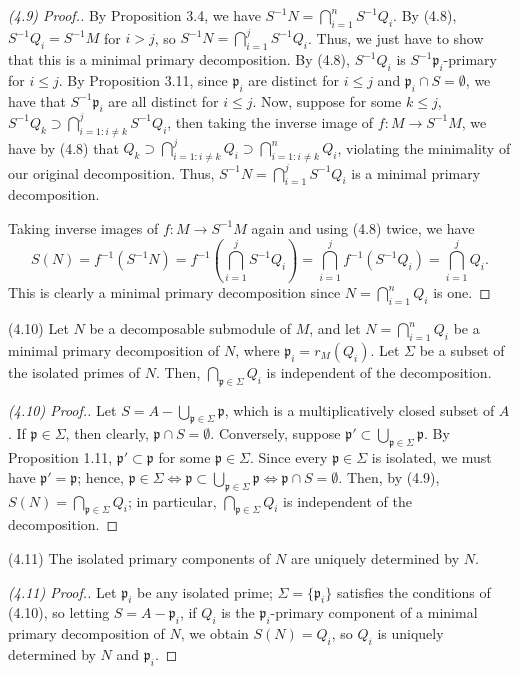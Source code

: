 \begin{proof}[(4.9) Proof.]
By Proposition 3.4, we have $S^{-1}N = \bigcap_{i=1}^n S^{-1}Q_i$. By (4.8), $S^{-1}Q_i = S^{-1}M$ for $i > j$, so $S^{-1}N = \bigcap_{i=1}^j S^{-1}Q_i$. Thus, we just have to show that this is a minimal
primary decomposition. By (4.8), $S^{-1}Q_i$ is $S^{-1}\mathfrak{p}_i$-primary for $i \le j$. By Proposition 3.11, since $\mathfrak{p}_i$ are distinct for $i \le j$ and $\mathfrak{p}_i \cap S = \emptyset$,
we have that $S^{-1}\mathfrak{p}_i$ are all distinct for $i \le j$. Now, suppose for some $k \le j$, $S^{-1}Q_k \supset \bigcap_{i=1 : i \neq k}^j S^{-1}Q_i$, then taking the inverse image of $f: M \to S^{-1}M$,
we have by (4.8) that $Q_k \supset \bigcap_{i=1 : i \neq k}^j Q_i \supset \bigcap_{i=1: i\neq k}^n Q_i$, violating the minimality of our original decomposition. Thus, $S^{-1}N = \bigcap_{i=1}^j S^{-1}Q_i$ is
a minimal primary decomposition.

Taking inverse images of $f : M \to S^{-1}M$ again and using (4.8) twice, we have
$$S(N) = f^{-1}(S^{-1}N) = f^{-1}\left(\bigcap_{i=1}^j S^{-1}Q_i\right) = \bigcap_{i=1}^j f^{-1}(S^{-1}Q_i) = \bigcap_{i=1}^j Q_i.$$
This is clearly a minimal primary decomposition since $N = \bigcap_{i=1}^n Q_i$ is one.
\end{proof}

(4.10) Let $N$ be a decomposable submodule of $M$, and let $N = \bigcap_{i=1}^n Q_i$ be a minimal primary decomposition of $N$, where $\mathfrak{p}_i = r_M(Q_i)$. Let $\Sigma$ be
a subset of the isolated primes of $N$. Then, $\bigcap_{\mathfrak{p} \in \Sigma} Q_i$ is independent of the decomposition.

\begin{proof}[(4.10) Proof.]
Let $S = A - \bigcup_{\mathfrak{p} \in \Sigma}\mathfrak{p}$, which is a multiplicatively closed subset of $A$. If $\mathfrak{p} \in \Sigma$, then clearly, $\mathfrak{p} \cap S = \emptyset$.
Conversely, suppose $\mathfrak{p}' \subset \bigcup_{\mathfrak{p} \in \Sigma}\mathfrak{p}$. By Proposition 1.11, $\mathfrak{p}' \subset \mathfrak{p}$ for some $\mathfrak{p} \in \Sigma$. Since
every $\mathfrak{p} \in \Sigma$ is isolated, we must have $\mathfrak{p}' = \mathfrak{p}$; hence, 
$\mathfrak{p} \in \Sigma \iff \mathfrak{p} \subset \bigcup_{\mathfrak{p} \in \Sigma}\mathfrak{p} \iff \mathfrak{p} \cap S = \emptyset$. Then, by (4.9), $S(N) = \bigcap_{\mathfrak{p} \in \Sigma}Q_i$;
in particular, $\bigcap_{\mathfrak{p} \in \Sigma} Q_i$ is independent of the decomposition.
\end{proof}

(4.11) The isolated primary components of $N$ are uniquely determined by $N$.

\begin{proof}[(4.11) Proof.]
Let $\mathfrak{p}_i$ be any isolated prime; $\Sigma = \{\mathfrak{p}_i\}$ satisfies the conditions of (4.10), so letting $S = A - \mathfrak{p}_i$, if $Q_i$ is the $\mathfrak{p}_i$-primary component of
a minimal primary decomposition of $N$, we obtain $S(N) = Q_i$, so $Q_i$ is uniquely determined by $N$ and $\mathfrak{p}_i$.
\end{proof}
